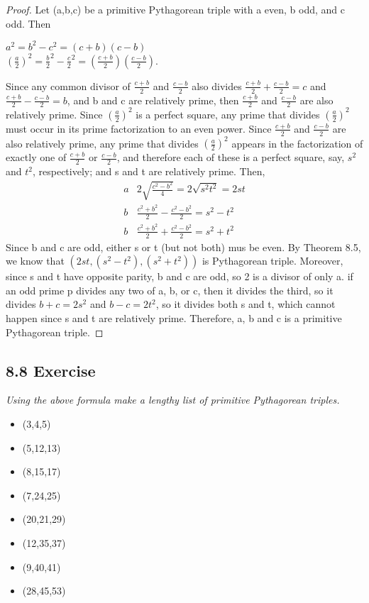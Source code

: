 \documentclass{article}
\begin{document}
\begin{proof}
Let (a,b,c) be a primitive Pythagorean triple with a even, b odd, and c odd. Then\
\begin{center}
    $a^2 = b^2 - c^2 = (c+b)(c-b)$\\
    $(\frac{a}{2})^2 = \frac{b}{2}^2 - \frac{c}{2}^2 = (\frac{c+b}{2})(\frac{c-b}{2}).$
\end{center}
Since any common divisor of $\frac{c+b}{2}$ and $\frac{c-b}{2}$ also divides $\frac{c+b}{2} + \frac{c-b}{2} = c$ and $\frac{c+b}{2} - \frac{c-b}{2} = b$, and b and c are relatively prime, then $\frac{c+b}{2}$ and $\frac{c-b}{2}$ are also relatively prime. Since $(\frac{a}{2})^2$ is a perfect square, any prime that divides $(\frac{a}{2})^2$ must occur in its prime factorization to an even power. Since $\frac{c+b}{2}$ and $\frac{c-b}{2}$ are also relatively prime, any prime that divides $(\frac{a}{2})^2$ appears in the factorization of exactly one of $\frac{c+b}{2}$ or $\frac{c-b}{2}$, and therefore each of these is a perfect square, say, $s^2$ and $t^2$, respectively; and s and t are relatively prime. Then,
\begin{align*}
    &&a & 2\sqrt{\frac{c^2-b^2}{4}} = 2\sqrt{s^2t^2} = 2st&&\\
    &&b & \frac{c^2+b^2}{2} - \frac{c^2-b^2}{2} = s^2 - t^2&&\\
    &&b & \frac{c^2+b^2}{2} + \frac{c^2-b^2}{2} = s^2 + t^2&&
\end{align*}
Since b and c are odd, either s or t (but not both) mus be even. By Theorem 8.5, we know that $(2st,(s^2-t^2),(s^2+t^2))$ is Pythagorean triple. Moreover, since s and t have opposite parity, b and c are odd, so 2 is a divisor of only a. if an odd prime p divides any two of a, b, or c, then it divides the third, so it divides $b + c = 2s^2$ and $b - c = 2t^2$, so it divides both s and t, which cannot happen since s and t are relatively prime. Therefore, a, b and c is a primitive Pythagorean triple.
\end{proof}

\subsection*{8.8 Exercise} 
\quad \textit{Using the above formula make a lengthy list of primitive Pythagorean triples.}

\begin{itemize}
    \item (3,4,5)
    \item (5,12,13)
    \item (8,15,17)
    \item (7,24,25)
    \item (20,21,29)
    \item (12,35,37)
    \item (9,40,41)
    \item (28,45,53)
\end{itemize}
\end{document}
